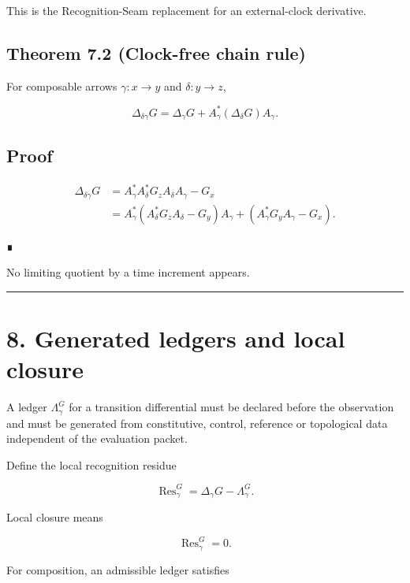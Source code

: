 This is the Recognition-Seam replacement for an external-clock derivative.

\hypertarget{theorem-7.2-clock-free-chain-rule}{%
\subsection{Theorem 7.2 (Clock-free chain rule)}\label{theorem-7.2-clock-free-chain-rule}}

For composable arrows \(\gamma:x\to y\) and \(\delta:y\to z\),

\[
\boxed{
\Delta_{\delta\gamma}G
=\Delta_\gamma G
+A_\gamma^*(\Delta_\delta G)A_\gamma.
}
\]

\hypertarget{proof-2}{%
\subsection{Proof}\label{proof-2}}

\[
\begin{aligned}
\Delta_{\delta\gamma}G
&=A_\gamma^*A_\delta^*G_zA_\delta A_\gamma-G_x\\
&=A_\gamma^*(A_\delta^*G_zA_\delta-G_y)A_\gamma
 +(A_\gamma^*G_yA_\gamma-G_x).
\end{aligned}
\]

∎

No limiting quotient by a time increment appears.

\begin{center}\rule{0.5\linewidth}{0.5pt}\end{center}

\hypertarget{generated-ledgers-and-local-closure}{%
\section{8. Generated ledgers and local closure}\label{generated-ledgers-and-local-closure}}

A ledger \(\Lambda_\gamma^G\) for a transition differential must be declared
before the observation and must be generated from constitutive, control,
reference or topological data independent of the evaluation packet.

Define the local recognition residue

\[
\operatorname{Res}_\gamma^G
=\Delta_\gamma G-\Lambda_\gamma^G.
\]

Local closure means

\[
\operatorname{Res}_\gamma^G=0.
\]

For composition, an admissible ledger satisfies

